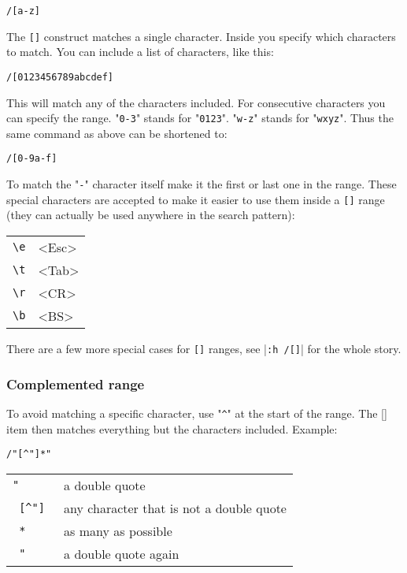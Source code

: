 \begin{Verbatim}[samepage=true]
 /[a-z]
\end{Verbatim}

The \texttt{[]} construct matches a single character.
Inside you specify which characters to match.
You can include a list of characters, like this:

\begin{Verbatim}[samepage=true]
 /[0123456789abcdef]
\end{Verbatim}

This will match any of the characters included.
For consecutive characters you can specify the range.
"\texttt{0-3}" stands for "\texttt{0123}".
"\texttt{w-z}" stands for "\texttt{wxyz}".
Thus the same command as above can be shortened to:

\begin{Verbatim}[samepage=true]
 /[0-9a-f]
\end{Verbatim}

To match the "\texttt{-}" character itself make it the first or last one in the range.
These special characters are accepted to make it easier to use them inside a \texttt{[]} range (they can actually be used anywhere in the search pattern):

\begin{center} \begin{tabular}{l l}
		\texttt{\textbackslash{}e} & <Esc> \\
		\texttt{\textbackslash{}t} & <Tab> \\
		\texttt{\textbackslash{}r} & <CR>  \\
		\texttt{\textbackslash{}b} & <BS>  \\
\end{tabular} \end{center}

There are a few more special cases for \texttt{[]} ranges, see |\texttt{:h /[]}| for the whole story.
\subsubsection{Complemented range}
To avoid matching a specific character, use "\texttt{\^{}}" at the start of the range.
The [] item then matches everything but the characters included.
Example:

\begin{Verbatim}[samepage=true]
 /"[^"]*"
\end{Verbatim}

\begin{center} \begin{tabular}{l l}
				\texttt{"      } & a double quote \\
				\texttt{ [\^{}"]  } & any character that is not a double quote \\
				\texttt{     * } & as many as possible \\
				\texttt{      "} & a double quote again \\
\end{tabular} \end{center}


